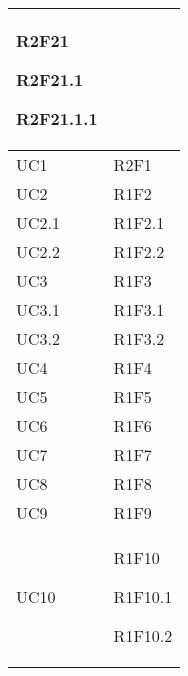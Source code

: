\begin{center}
\begin{longtable}{|p{44mm}|p{22mm}|}
R2F21 \newline

R2F21.1 \newline

R2F21.1.1 \newline
\\
\hline
UC1 &

 R2F1 \newline
\\
\hline
UC2 &

R1F2 \newline
\\
\hline
UC2.1 &

R1F2.1 \newline
\\
\hline
UC2.2 &

R1F2.2 \newline
\\
\hline
UC3 &

R1F3 \newline
\\
\hline
UC3.1 &

R1F3.1 \newline
\\
\hline
UC3.2 &

R1F3.2 \newline
\\
\hline
UC4 &

R1F4 \newline
\\
\hline
UC5 &

R1F5 \newline
\\
\hline
UC6 &

R1F6 \newline
\\
\hline
UC7 &

R1F7 \newline
\\
\hline
UC8 &

R1F8 \newline
\\
\hline
UC9 &

R1F9 \newline
\\
\hline
UC10 &

R1F10 \newline

R1F10.1 \newline

R1F10.2 \newline


\end{longtable}
\end{center}
